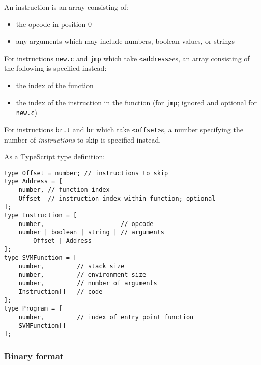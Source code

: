 An instruction is an array consisting of:

\begin{itemize}
\item
  the opcode in position 0
\item
  any arguments which may include numbers, boolean values, or strings
\end{itemize}

For instructions \texttt{new.c} and \texttt{jmp} which take
\texttt{\textless{}address\textgreater{}}es, an array consisting of the
following is specified instead:

\begin{itemize}
\item
  the index of the function
\item
  the index of the instruction in the function (for \texttt{jmp};
  ignored and optional for \texttt{new.c})
\end{itemize}

For instructions \texttt{br.t} and \texttt{br} which take
\texttt{\textless{}offset\textgreater{}}s, a number specifying the
number of \emph{instructions} to skip is specified instead.

As a TypeScript type definition:

\begin{lstlisting}
type Offset = number; // instructions to skip
type Address = [
    number, // function index
    Offset  // instruction index within function; optional
];
type Instruction = [
    number,                     // opcode
    number | boolean | string | // arguments
        Offset | Address
];
type SVMFunction = [
    number,         // stack size
    number,         // environment size
    number,         // number of arguments
    Instruction[]   // code
];
type Program = [
    number,         // index of entry point function
    SVMFunction[]
];
\end{lstlisting}

\subsubsection{Binary format}

